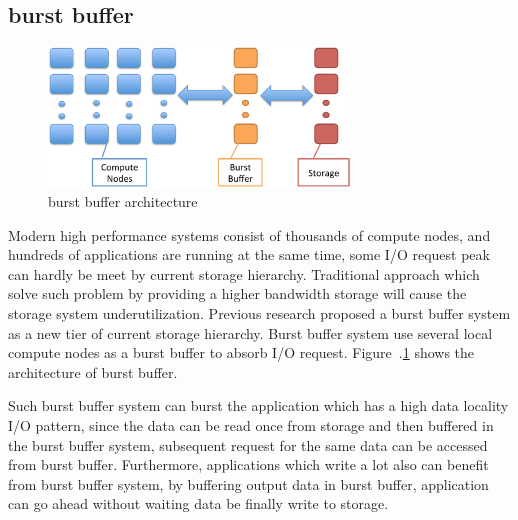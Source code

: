\subsection{burst buffer}
\begin{figure}
\centering
\includegraphics[width=8cm]{img/burst_buffer.pdf}
\caption{burst buffer architecture}
\label{background:burst buffer architecture}
\end{figure}

Modern high performance systems consist of thousands of compute nodes, and hundreds of
applications are running at the same time, some I/O request peak can hardly be meet by current
storage hierarchy. 
Traditional approach which solve such problem by providing a higher bandwidth storage will cause
the storage system underutilization.
Previous research\cite{on_the_role_of_burst_buffers} proposed a
burst buffer system as a new tier of current storage hierarchy.
Burst buffer system use several local compute nodes as a burst buffer to absorb I/O
request. 
Figure~.\ref{background:burst buffer architecture} shows the architecture of burst buffer.

Such burst buffer system can burst the application which has a high data locality I/O pattern, since
the data can be read once from storage and then buffered in the burst buffer system, subsequent
request for the same data can be accessed from burst buffer.
Furthermore, applications which write a lot also can benefit from burst buffer system, by buffering
output data in burst buffer, application can go ahead without waiting data be finally write to
storage.


